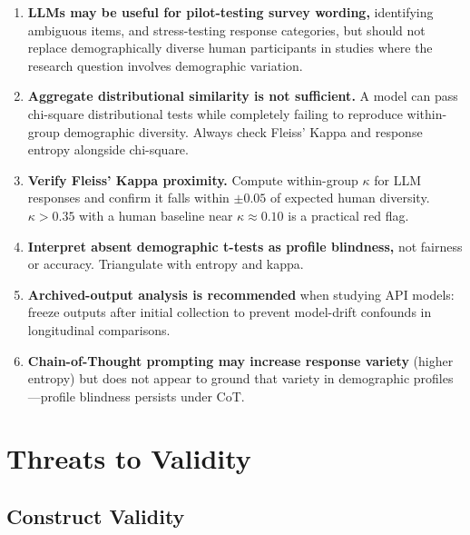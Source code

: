 \documentclass[12pt,a4paper]{article}
\begin{document}
\begin{enumerate}[leftmargin=1.6em,itemsep=3pt]
\item \textbf{LLMs may be useful for pilot-testing survey wording,}
  identifying ambiguous items, and stress-testing response categories,
  but should not replace demographically diverse human participants
  in studies where the research question involves demographic variation.

\item \textbf{Aggregate distributional similarity is not sufficient.}
  A model can pass chi-square distributional tests while completely
  failing to reproduce within-group demographic diversity.
  Always check Fleiss' Kappa and response entropy alongside chi-square.

\item \textbf{Verify Fleiss' Kappa proximity.}
  Compute within-group $\kappa$ for LLM responses and confirm it
  falls within $\pm 0.05$ of expected human diversity.
  $\kappa > 0.35$ with a human baseline near $\kappa{\approx}0.10$
  is a practical red flag.

\item \textbf{Interpret absent demographic t-tests as profile blindness,}
  not fairness or accuracy. Triangulate with entropy and kappa.

\item \textbf{Archived-output analysis is recommended}
  when studying API models: freeze outputs after initial collection
  to prevent model-drift confounds in longitudinal comparisons.

\item \textbf{Chain-of-Thought prompting may increase response variety}
  (higher entropy) but does not appear to ground that variety in
  demographic profiles---profile blindness persists under CoT.
\end{enumerate}

\section{Threats to Validity}
\label{sec:threats}

\subsection{Construct Validity}
\label{sec:threats:construct}
\end{document}
